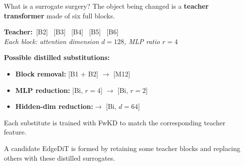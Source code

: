 \documentclass[aspectratio=169,10pt]{beamer}
\begin{document}
\begin{frame}{What is a surrogate surgery?}
\small
The object being changed is a \textbf{teacher transformer} made of six full blocks.

\vspace{0.8em}
\begin{center}
  \textbf{Teacher:}\quad [B1] \ [B2] \ [B3] \ [B4] \ [B5] \ [B6]\\[0.4em]
  \textit{\footnotesize Each block: attention dimension $d=128$, MLP ratio $r=4$}
\end{center}

\vspace{0.8em}
\textbf{Possible distilled substitutions:}
\begin{itemize}
  \itemsep0.2em
  \item \textbf{Block removal:}\hspace{4.2em} [B1 + B2] $\rightarrow$ [M12]
  \item \textbf{MLP reduction:}\hspace{3.8em} [Bi, $r=4$] $\rightarrow$ [Bi, $r=2$]
  \item \textbf{Hidden-dim reduction:}\quad [Bi, $d=128$] $\rightarrow$ [Bi, $d=64$]
\end{itemize}

\vspace{0.8em}
Each substitute is trained with FwKD to match the corresponding teacher feature.

\vspace{0.5em}
\begin{block}{}
  \centering
  A candidate EdgeDiT is formed by retaining some teacher blocks and replacing others with these distilled surrogates.
\end{block}
\end{frame}
\end{document}

